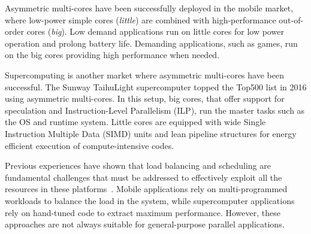 Asymmetric multi-cores have been successfully deployed in the mobile market, where 
low-power simple cores (\emph{little}) are combined with 
high-performance out-of-order cores (\emph{big}). Low demand applications
run on little cores for low power operation and prolong battery life. Demanding
applications, such as games, run on the big cores providing high performance
when needed.

Supercomputing is another market where asymmetric multi-cores have been successful. 
The Sunway TaihuLight supercomputer topped the Top500 list in 2016 using asymmetric multi-cores. 
In this setup, big cores, that offer support for speculation and Instruction-Level Parallelism (ILP), run the master tasks such as the OS and runtime system.
Little cores are equipped with wide Single Instruction Multiple Data (SIMD) units and lean pipeline structures for energy efficient execution of compute-intensive codes. 

Previous experiences have shown that load balancing and scheduling are fundamental challenges that 
must be addressed to effectively exploit all the resources in these 
platforms~\cite{Suleman:APLOS2009,Fedorova2009,Greenhalgh2011,Joao:ASPLOS2012,Joao:ISCA2013,
ARM4HPC_SC13}. 
Mobile applications rely on multi-programmed workloads to balance the load in the 
system, while supercomputer applications rely on hand-tuned code to extract maximum 
performance. However, these approaches are not always suitable for general-purpose parallel 
applications.


